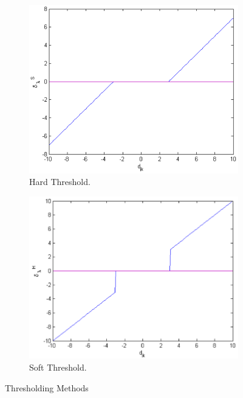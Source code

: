 \documentclass{article}
\begin{document}
\begin{figure}[h!]
	\centering
	\begin{subfigure}[b]{0.4\linewidth}
		\includegraphics[width=\linewidth]{../../1_Resources/images/hard_thresholding.png}
		\caption{Hard Threshold.}
	\end{subfigure}
	\begin{subfigure}[b]{0.4\linewidth}
		\includegraphics[width=\linewidth]{../../1_Resources/images/soft_thresholding.png}
		\caption{Soft Threshold.}
	\end{subfigure}	
	\caption{Thresholding Methods}
	\label{fig:thresholding}
\end{figure}
\end{document}

